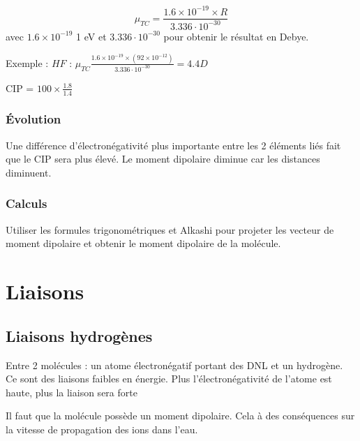 \documentclass[french]{yLectureNote}
\begin{document}

\begin{theorem}[Calculer $\mu_{TC}$]
\[\mu_{TC} = \frac{1.6\times 10^{-19} \times R}{3.336\cdot 10^{-30}}\] avec $1.6\times 10^{-19}$ 1 eV et $3.336\cdot 10^{-30}$ pour obtenir le résultat en Debye.
\end{theorem}
Exemple : $HF$ : $\mu_{TC} \frac{1.6\times 10^{-19} \times (92\times 10^{-12})}{3.336\cdot 10^{-30}} = 4.4D$

CIP = $100\times \frac{1.8}{1.4}$
\subsubsection{Évolution}
Une différence d'électronégativité plus importante entre les 2 éléments liés fait que le CIP sera plus élevé. Le moment dipolaire diminue car les distances diminuent.
\subsubsection{Calculs}
Utiliser les formules trigonométriques et Alkashi pour projeter les vecteur de moment dipolaire et obtenir le moment dipolaire de la molécule.
\section{Liaisons}
\subsection{Liaisons hydrogènes}
\begin{theorem}[Définition]
Entre 2 molécules : un atome électronégatif portant des DNL et un hydrogène. Ce sont des liaisons faibles en énergie. Plus l'électronégativité de l'atome est haute, plus la liaison sera forte
\end{theorem}
Il faut que la molécule possède un moment dipolaire. Cela à des conséquences sur la vitesse de propagation des ions dans l'eau.
\end{document}
